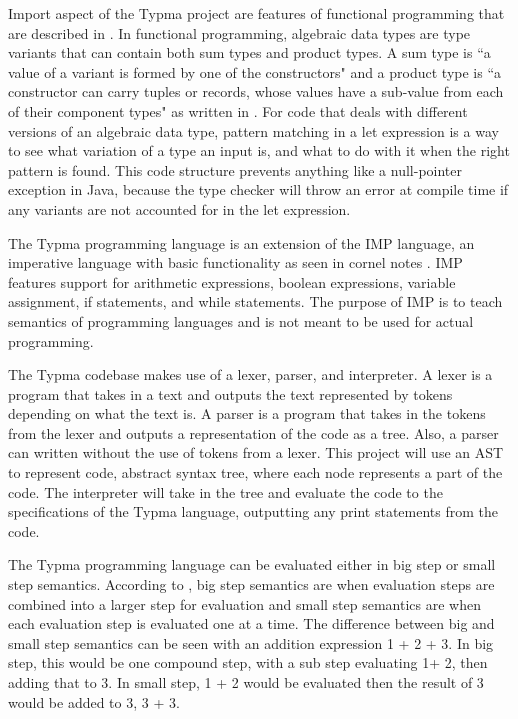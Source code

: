 \documentclass[10pt,twocolumn]{article}
\begin{document}
Import aspect of the Typma project are features of functional programming that are described in \textcite{OCaml}. In functional programming, algebraic data types are type variants that can contain both sum types and product types. A sum type is ``a value of a variant is formed by one of the constructors" and a product type is ``a constructor can carry tuples or records, whose values have a sub-value from each of their component types" as written in \textcite{OCaml}. For code that deals with different versions of an algebraic data type, pattern matching in a let expression is a way to see what variation of a type an input is, and what to do with it when the right pattern is found. This code structure prevents anything like a null-pointer exception in Java, because the type checker will throw an error at compile time if any variants are not accounted for in the let expression.

The Typma programming language is an extension of the IMP language, an imperative language with basic functionality as seen in cornel notes \textcite{CS4110IMP}. IMP features support for arithmetic expressions, boolean expressions, variable assignment, if statements, and while statements. The purpose of IMP is to teach semantics of programming languages and is not meant to be used for actual programming.

The Typma codebase makes use of a lexer, parser, and interpreter. A lexer is a program that takes in a text and outputs the text represented by tokens depending on what the text is. A parser is a program that takes in the tokens from the lexer and outputs a representation of the code as a tree. Also, a parser can written without the use of tokens from a lexer. This project will use an AST to represent code, abstract syntax tree, where each node represents a part of the code. The interpreter will take in the tree and evaluate the code to the specifications of the Typma language, outputting any print statements from the code.

The Typma programming language can be evaluated either in big step or small step semantics. According to \textcite{CS4110IMP}, big step semantics are when evaluation steps are combined into a larger step for evaluation and small step semantics are when each evaluation step is evaluated one at a time. The difference between big and small step semantics can be seen with an addition expression 1 + 2 + 3. In big step, this would be one compound step, with a sub step evaluating 1+ 2, then adding that to 3. In small step, 1 + 2 would be evaluated then the result of 3 would be added to 3, 3 + 3.
\end{document}
